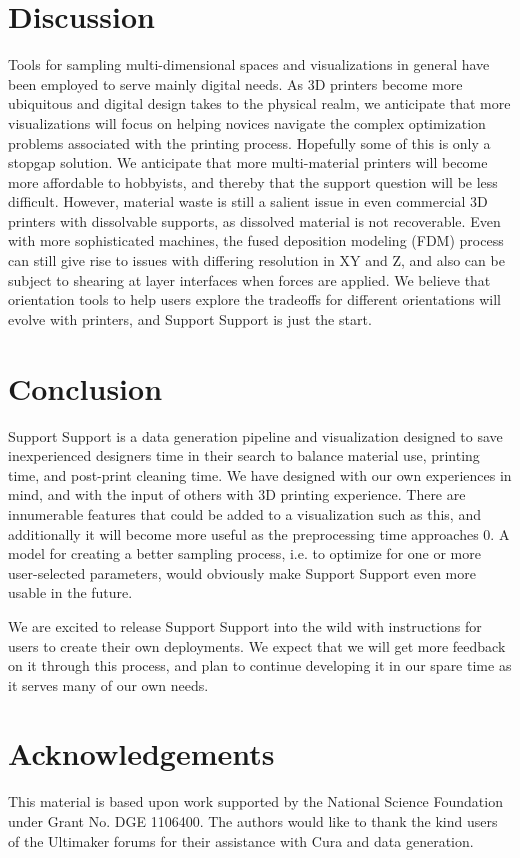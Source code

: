 \documentclass{sigchi}
\begin{document}
\section{Discussion}
Tools for sampling multi-dimensional spaces and visualizations in general have been employed to serve mainly digital needs.  As 3D printers become more ubiquitous and digital design takes to the physical realm, we anticipate that more visualizations will focus on helping novices navigate the complex optimization problems associated with the printing process.  Hopefully some of this is only a stopgap solution.  We anticipate that more multi-material printers will become more affordable to hobbyists, and thereby that the support question will be less difficult.  However, material waste is still a salient issue in even commercial 3D printers with dissolvable supports, as dissolved material is not recoverable.  Even with more sophisticated machines, the fused deposition modeling (FDM) process can still give rise to issues with differing resolution in XY and Z, and also can be subject to shearing at layer interfaces when forces are applied.  We believe that orientation tools to help users explore the tradeoffs for different orientations will evolve with printers, and Support Support is just the start.

\section{Conclusion}
Support Support is a data generation pipeline and visualization designed to save inexperienced designers time in their search to balance material use, printing time, and post-print cleaning time.  We have designed with our own experiences in mind, and with the input of others with 3D printing experience.  There are innumerable features that could be added to a visualization such as this, and additionally it will become more useful as the preprocessing time approaches 0.  A model for creating a better sampling process, i.e. to optimize for one or more user-selected parameters, would obviously make Support Support even more usable in the future.

We are excited to release Support Support into the wild with instructions for users to create their own deployments.  We expect that we will get more feedback on it through this process, and plan to continue developing it in our spare time as it serves many of our own needs.

\section{Acknowledgements}
This material is based upon work supported by the National Science Foundation under Grant No. DGE 1106400.  The authors would like to thank the kind users of the Ultimaker forums for their assistance with Cura and data generation.

\balance

\small

\end{document}
